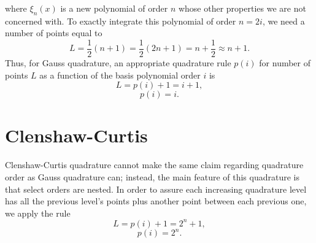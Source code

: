 \documentclass[11pt]{article}
\begin{document}
where $\xi_n(x)$ is a new polynomial of order $n$ whose other properties we are not concerned with.  To exactly integrate this polynomial of order $n=2i$, we need a number of points equal to 
\begin{equation}
L=\frac{1}{2}(n+1)=\frac{1}{2}(2n+1)=n+\frac{1}{2}\approx n+1.
\end{equation}
Thus, for Gauss quadrature, an appropriate quadrature rule $p(i)$ for number of points $L$ as a function of the basis polynomial order $i$ is
\begin{equation}
L = p(i)+1=i+1, 
\end{equation}
\begin{equation}
p(i)=i.
\end{equation}

\section{Clenshaw-Curtis}
Clenshaw-Curtis quadrature cannot make the same claim regarding quadrature order as Gauss quadrature can; instead, the main feature of this quadrature is that select orders are nested.  In order to assure each increasing quadrature level has all the previous level's points plus another point between each previous one, we apply the rule
\begin{equation}
L = p(i)+1 = 2^n+1,
\end{equation}
\begin{equation}
p(i) = 2^n.
\end{equation}
\end{document}
